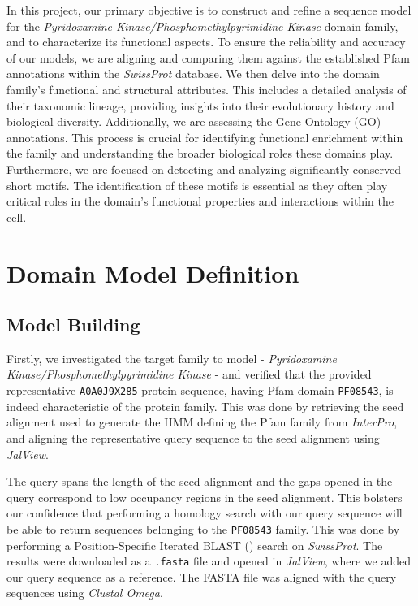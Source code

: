 \documentclass[10pt,twocolumn,letterpaper]{article}
\begin{document}
In this project, our primary objective is to construct and refine a sequence model for the \textit{Pyridoxamine Kinase/Phosphomethylpyrimidine Kinase} domain family, and to characterize its functional aspects. To ensure the reliability and accuracy of our models, we are aligning and comparing them against the established Pfam annotations within the \textit{SwissProt} database. We then delve into the domain family's functional and structural attributes. This includes a detailed analysis of their taxonomic lineage, providing insights into their evolutionary history and biological diversity. Additionally, we are assessing the Gene Ontology (GO) annotations. This process is crucial for identifying functional enrichment within the family and understanding the broader biological roles these domains play. Furthermore, we are focused on detecting and analyzing significantly conserved short motifs. The identification of these motifs is essential as they often play critical roles in the domain's functional properties and interactions within the cell.

\section{Domain Model Definition}

\subsection{Model Building}

Firstly, we investigated the target family to model - \textit{Pyridoxamine Kinase/Phosphomethylpyrimidine Kinase} - and verified that the provided representative \texttt{A0A0J9X285}\cite{representative_protein} protein sequence, having Pfam domain \texttt{PF08543}, is indeed characteristic of the protein family. 
This was done by retrieving the seed alignment used to generate the HMM defining the Pfam family from \textit{InterPro}, and aligning the representative query sequence to the seed alignment using \textit{JalView}.

The query spans the length of the seed alignment and the gaps opened in the query correspond to low occupancy regions in the seed alignment. This bolsters our confidence that performing a homology search with our query sequence will be able to return sequences belonging to the \texttt{PF08543} family. This was done by performing a Position-Specific Iterated BLAST () search on \textit{SwissProt}. The results were downloaded as a \texttt{.fasta} file and opened in \textit{JalView}, where we added our query sequence as a reference. The FASTA file was aligned with the query sequences using \textit{Clustal Omega}.
\end{document}
